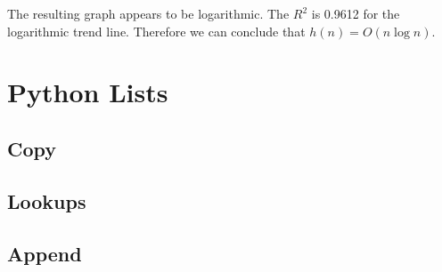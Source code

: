 \documentclass[12pt]{article}
\begin{document}
\noindent The resulting graph appears to be logarithmic. The $R^2$ is 0.9612 for the logarithmic trend line. Therefore we can conclude that $h(n) = O(n\log{n})$.

\section{Python Lists}

\subsection{Copy}

\subsection{Lookups}

\subsection{Append}
\end{document}
